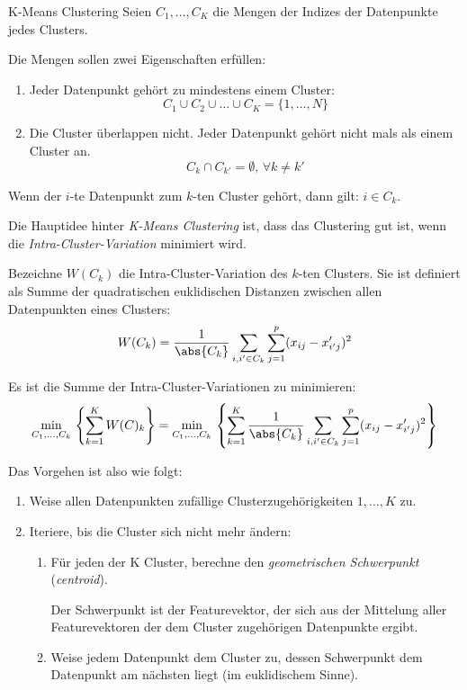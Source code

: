 \begin{defi}{K-Means Clustering}
    Seien $C_1, \ldots, C_K$ die Mengen der Indizes der Datenpunkte jedes Clusters.

    Die Mengen sollen zwei Eigenschaften erfüllen:
    \begin{enumerate}
        \item Jeder Datenpunkt gehört zu mindestens einem Cluster:
              \[
                  C_1 \cup C_2 \cup \ldots \cup C_K = \{ 1, \ldots, N \}
              \]
        \item Die Cluster überlappen nicht.
              Jeder Datenpunkt gehört nicht mals als einem Cluster an.
              \[
                  C_k \cap C_{k'} = \emptyset, \, \forall k \neq k'
              \]
    \end{enumerate}

    Wenn der $i$-te Datenpunkt zum $k$-ten Cluster gehört, dann gilt: $i \in C_k$.

    Die Hauptidee hinter \emph{K-Means Clustering} ist, dass das Clustering gut ist, wenn die \emph{Intra-Cluster-Variation} minimiert wird.

    Bezeichne $W(C_k)$ die Intra-Cluster-Variation des $k$-ten Clusters.
    Sie ist definiert als Summe der quadratischen euklidischen Distanzen zwischen allen Datenpunkten eines Clusters:
    \[
        W(C_k) = \frac{1}{\abs{C_k}} \sum_{i, i' \in C_k} \sum_{j=1}^p (x_{ij} - x'_{i'j})^2
    \]

    Es ist die Summe der Intra-Cluster-Variationen zu minimieren:
    \[
        \min_{C_1, \ldots, C_k} \, \left\{ \sum_{k=1}^K W(C)_k \right\} = \min_{C_1, \ldots, C_k} \, \left\{ \sum_{k=1}^K \frac{1}{\abs{C_k}} \sum_{i, i' \in C_k} \sum_{j=1}^p (x_{ij} - x'_{i'j})^2 \right\}
    \]

    Das Vorgehen ist also wie folgt:
    \begin{enumerate}
        \item Weise allen Datenpunkten zufällige Clusterzugehörigkeiten $1, \ldots, K$ zu.
        \item Iteriere, bis die Cluster sich nicht mehr ändern:
              \begin{enumerate}
                  \item Für jeden der K Cluster, berechne den \emph{geometrischen Schwerpunkt} (\emph{centroid}).

                        Der Schwerpunkt ist der Featurevektor, der sich aus der Mittelung aller Featurevektoren der dem Cluster zugehörigen Datenpunkte ergibt.
                  \item Weise jedem Datenpunkt dem Cluster zu, dessen Schwerpunkt dem Datenpunkt am nächsten liegt (im euklidischem Sinne).
              \end{enumerate}
    \end{enumerate}


\end{defi}
